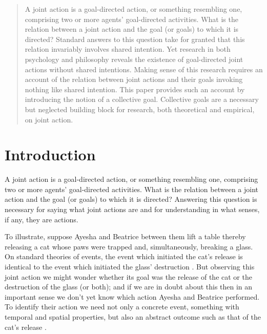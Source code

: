 \documentclass[12pt,a4paper]{extarticle}
\begin{document}
\setlength\footnotesep{1em}


\maketitle

\begin{abstract}
A joint action is a goal-directed action, or something resembling one, comprising two or more agents' goal-directed activities.  
What is the relation between a joint action and the goal (or goals) to which it is directed?  
Standard answers to this question take for granted that  this relation invariably involves shared intention.  
Yet research in both psychology and philosophy reveals the existence of goal-directed joint actions without shared intentions.
Making sense of this research requires an account of the relation between joint actions and their goals invoking nothing like shared intention.
This paper provides such an account by introducing the notion of a collective goal.
Collective goals are a necessary but neglected building block for research, both theoretical and empirical, on joint action.



\end{abstract}


\section{Introduction}
A joint action is a goal-directed action, or something resembling one, comprising two or more agents' goal-directed activities.  What is the relation between a joint action and the goal (or goals) to which it is directed?  
Answering this question is necessary for saying what joint actions are and for understanding in what senses, if any, they are actions.


To illustrate, suppose Ayesha and Beatrice between them lift a table thereby releasing a cat whose paws were trapped and,  simultaneously, breaking a glass.  On standard theories of events, the event which initiated the cat's release is identical to the event which initiated the glass' destruction \citep{Davidson:1969ie}.  But observing this joint action we might wonder whether its goal was the release of the cat or the destruction of the glass (or both); and if we are in doubt about this then in an important sense we don't yet know which action Ayesha and Beatrice performed.  To identify their action we need not only a concrete event, something with temporal and spatial properties, but also an abstract outcome such as that of the cat's release \citep{Davidson:1971fz}.
\end{document}
